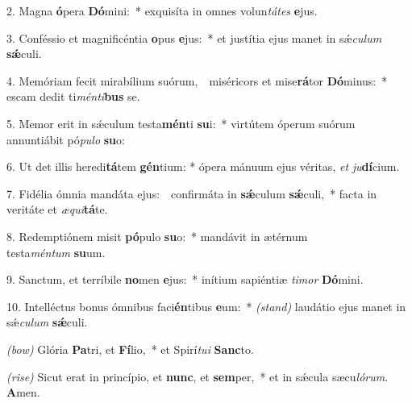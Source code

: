 2. Magna \textbf{ó}pera \textbf{Dó}mini:~*
	exquisíta in omnes volun\textit{tá}\textit{tes} \textbf{e}jus.

3. Conféssio et magnificéntia \textbf{o}pus \textbf{e}jus:~*
	et justítia ejus manet in s\'{\ae}\textit{cu}\textit{lum} \textbf{s\'{\ae}}culi.

4. Memóriam fecit mirabílium suórum,~{\color{red}\GreDagger}\
	miséricors et mise\textbf{rá}tor \textbf{Dó}minus:~*
	escam dedit ti\textit{mén}\textit{ti}\textbf{bus} se.

5. Memor erit in s\'{\ae}culum testa\textbf{mén}ti \textbf{su}i:~*
	virtútem óperum suórum annuntiábit pó\textit{pu}\textit{lo} \textbf{su}o:

6. Ut det illis heredi\textbf{tá}tem \textbf{gén}tium: *
	ópera mánuum ejus véritas, \textit{et} \textit{ju}\textbf{dí}\-cium.

7. Fidélia ómnia mandáta ejus:~{\color{red}\GreDagger}\
	confirmáta in \textbf{s\'{\ae}}culum \textbf{s\'{\ae}}culi,~*
	facta in veritáte et \textit{æ}\textit{qui}\textbf{tá}te.

8. Redemptiónem misit \textbf{pó}pulo \textbf{su}o:~*
	mandávit in ætérnum\\ testa\textit{mén}\textit{tum} \textbf{su}um.

9. Sanctum, et terríbile \textbf{no}men \textbf{e}jus:~*
	inítium sapiéntiæ \textit{ti}\textit{mor} \textbf{Dó}\-mini.

10. Intelléctus bonus ómnibus faci\textbf{én}tibus \textbf{e}um:~* {\color{red}\textit{(stand)}}
	laudátio ejus manet in s\'{\ae}\textit{cu}\textit{lum} \textbf{s\'{\ae}}culi.

{\color{red}\textit{(bow)}} Glória \textbf{Pa}tri, et \textbf{Fí}lio,~*
	et Spirí\textit{tu}\textit{i} \textbf{Sanc}to.

{\color{red}\textit{(rise)}} Sicut erat in princípio, et \textbf{nunc}, et \textbf{sem}per,~*
	et in s\'{\ae}cula sæcu\textit{ló}\textit{rum}. \textbf{A}men.